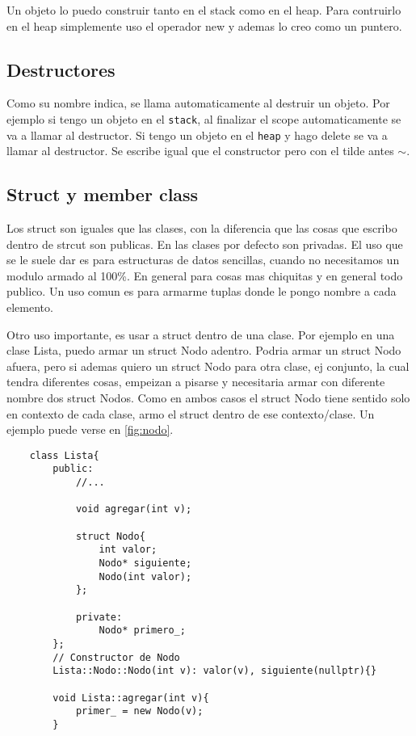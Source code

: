 \documentclass[11pt]{article}
\begin{document}
Un objeto lo puedo construir tanto en el stack como en el heap.
Para contruirlo en el heap simplemente uso el operador new y ademas lo creo como
un puntero.

\subsection{Destructores}
Como su nombre indica, se llama automaticamente al destruir un objeto.
Por ejemplo si tengo un objeto en el \texttt{stack}, al finalizar el scope automaticamente
se va a llamar al destructor.
Si tengo un objeto en el \texttt{heap} y hago delete se va a llamar al destructor.
Se escribe igual que el constructor pero con el tilde antes $\sim$.

\subsection{Struct y member class}
Los struct son iguales que las clases, con la diferencia que las cosas que escribo
dentro de strcut son publicas.
En las clases por defecto son privadas.
El uso que se le suele dar es para estructuras de datos sencillas, cuando no
necesitamos un modulo armado al 100\%.
En general para cosas mas chiquitas y en general todo publico.
Un uso comun es para armarme tuplas donde le pongo nombre a cada elemento.

Otro uso importante, es usar a struct dentro de una clase.
Por ejemplo en una clase Lista, puedo armar un struct Nodo adentro.
Podria armar un struct Nodo afuera, pero si ademas quiero un struct Nodo
para otra clase, ej conjunto, la cual tendra diferentes cosas, empeizan a pisarse
y necesitaria armar con diferente nombre dos struct Nodos.
Como en ambos casos el struct Nodo tiene sentido solo en contexto de cada clase,
armo el struct dentro de ese contexto/clase.
Un ejemplo puede verse en \ref{fig:nodo}.

\begin{lstlisting}
    class Lista{
        public:
            //...

            void agregar(int v);

            struct Nodo{
                int valor;
                Nodo* siguiente;
                Nodo(int valor);
            };

            private:
                Nodo* primero_;
        };
        // Constructor de Nodo
        Lista::Nodo::Nodo(int v): valor(v), siguiente(nullptr){}

        void Lista::agregar(int v){
            primer_ = new Nodo(v);
        }
\end{lstlisting}
\end{document}
